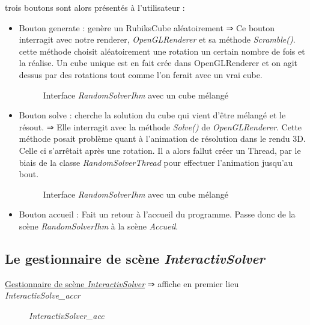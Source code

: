 trois boutons sont alors présentés à l'utilisateur :
\begin{itemize}
 	\item Bouton generate : genère un RubiksCube aléatoirement 
	    ⇒ Ce bouton interragit avec notre renderer, \textit{OpenGLRenderer} et sa méthode \textit{Scramble()}. cette méthode choisit aléatoirement une rotation un certain nombre de fois et la réalise.
Un cube unique est en fait crée dans OpenGLRenderer et on agit dessus par des rotations tout comme l'on ferait avec un vrai cube.

\begin{figure}[h]
\begin{center}
\end{center}
	\caption{Interface  \textit{RandomSolverIhm} avec un cube mélangé}
\end{figure}

	\item Bouton solve : cherche la solution du cube qui vient d'être mélangé et le résout.
	   ⇒  Elle interragit avec la méthode \textit{Solve()} de \textit{OpenGLRenderer}. Cette méthode posait problème quant à l'animation de résolution dans le rendu 3D. Celle ci s'arrêtait après une rotation. Il a alors
fallut créer un Thread,  par le biais de la classe \textit{RandomSolverThread} pour effectuer l'animation jusqu'au bout.
\begin{figure}[h]
\begin{center}
\end{center}
	\caption{Interface  \textit{RandomSolverIhm} avec un cube mélangé}
\end{figure}

	\item Bouton accueil : Fait un retour à l'accueil du programme. Passe donc de la scène \textit{RandomSolverIhm} à la scène \textit{Accueil}.
\end{itemize}

\subsection{Le gestionnaire de scène \textit{InteractivSolver}}
\underline{Gestionnaire de scène \textit{InteractivSolver}}
⇒ affiche en premier lieu \textit{InteractivSolve\_accr}

\begin{figure}[h]
\begin{center}
\end{center}
	\caption{ \textit{InteractivSolver\_acc}}
\end{figure}

